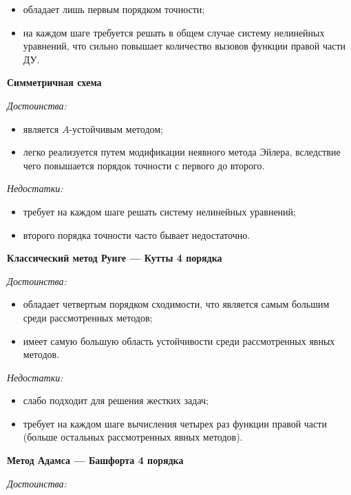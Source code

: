 \documentclass[12pt, a4paper]{article}
\begin{document}
\begin{enumerate}
		\begin{itemize}
			\item обладает лишь первым порядком точности;
			\item на каждом шаге требуется решать в общем случае систему нелинейных уравнений, что сильно повышает количество вызовов функции правой части ДУ.
		\end{itemize}
		
		\textbf{Симметричная схема}
		
		\textit{Достоинства:}
		
		\begin{itemize}
			\item является $A$-устойчивым методом;
			\item легко реализуется путем модификации неявного метода Эйлера, вследствие чего повышается порядок точности с первого до второго.
		\end{itemize}
		
		\textit{Недостатки:}
		
		\begin{itemize}
			\item требует на каждом шаге решать систему нелинейных уравнений;
			\item второго порядка точности часто бывает недостаточно.
		\end{itemize}
		
		\textbf{Классический метод Рунге --- Кутты 4 порядка}
		
		\textit{Достоинства:}
		
		\begin{itemize}
			\item обладает четвертым порядком сходимости, что является самым большим среди рассмотренных методов;
			\item имеет самую большую область устойчивости среди рассмотренных явных методов.
		\end{itemize}
		
		\textit{Недостатки:}
		
		\begin{itemize}
			\item слабо подходит для решения жестких задач;
			\item требует на каждом шаге вычисления четырех раз функции правой части (больше остальных рассмотренных явных методов).
		\end{itemize}
		
		\textbf{Метод Адамса --- Башфорта 4 порядка}
		
		\textit{Достоинства:}
		

\end{enumerate}
\end{document}
